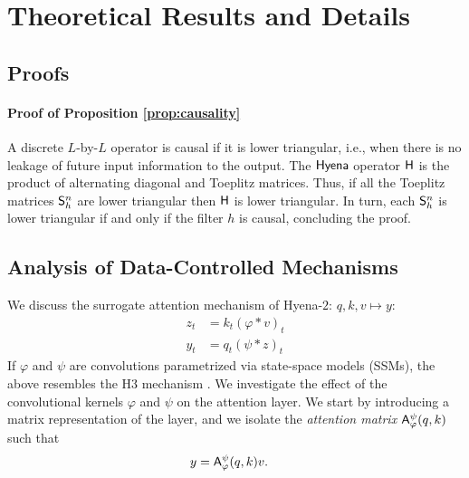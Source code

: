 \section{Theoretical Results and Details}
%
\subsection{Proofs}
%
\paragraph{Proof of Proposition \ref{prop:causality}}
\proof A discrete $L$-by-$L$ operator is causal if it is lower triangular, i.e., when there is no leakage of future input information to the output. The ${\sf Hyena}$ operator $\mathsf{H}$ is the product of alternating diagonal and Toeplitz matrices. Thus, if all the Toeplitz matrices $\mathsf{S}_h^n$ are lower triangular then $\mathsf{H}$ is lower triangular. In turn, each $\mathsf{S}_h^n$ is lower triangular if and only if the filter $h$ is causal, concluding the proof. 
\endproof
%
\subsection{Analysis of Data-Controlled Mechanisms}\label{app:surrogate_att}
%
 We discuss the surrogate attention mechanism of {\sf Hyena}-$2$: $q,k,v\mapsto y$:
%
\begin{equation}\label{eq:linear_attention}
    \begin{aligned}
        z_t &= k_t(\varphi * v)_t \\
        y_t &= q_t(\psi * z)_t
    \end{aligned}
\end{equation}
%
If $\varphi$ and $\psi$ are convolutions parametrized via state-space models (SSMs), the above resembles the H3 mechanism \citep{dao2022hungry}. We investigate the effect of the convolutional kernels $\varphi$ and $\psi$ on the attention layer. We start by introducing a matrix representation of the layer, and we isolate the \textit{attention matrix} $\mathsf{A}_\varphi^\psi(q,k)$ such that
%
\begin{equation}\label{eq:linear_attention_matrix}
    \begin{aligned}
        y &= \mathsf{A}_\varphi^\psi(q,k)v.
    \end{aligned}
\end{equation}
%
